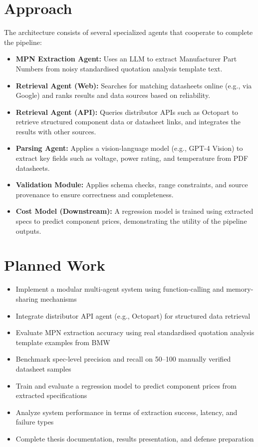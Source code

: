 \documentclass[11pt]{article}
\begin{document}
\section*{Approach}
The architecture consists of several specialized agents that cooperate to complete the pipeline:
\begin{itemize}
  \item \textbf{MPN Extraction Agent:} Uses an LLM to extract Manufacturer Part Numbers from noisy standardised quotation analysis template text.
  \item \textbf{Retrieval Agent (Web):} Searches for matching datasheets online (e.g., via Google) and  ranks results and data sources based on reliability.
  \item \textbf{Retrieval Agent (API):} Queries distributor APIs such as Octopart to retrieve structured component data or datasheet links, and integrates the results with other sources.
  \item \textbf{Parsing Agent:} Applies a vision-language model (e.g., GPT-4 Vision) to extract key fields such as voltage, power rating, and temperature from PDF datasheets.
  \item \textbf{Validation Module:} Applies schema checks, range constraints, and source provenance to ensure correctness and completeness.
  \item \textbf{Cost Model (Downstream):} A regression model is trained using extracted specs to predict component prices, demonstrating the utility of the pipeline outputs.
\end{itemize}


\section*{Planned Work}
\begin{itemize}
  \item Implement a modular multi-agent system using function-calling and memory-sharing mechanisms
  \item Integrate distributor API agent (e.g., Octopart) for structured data retrieval
  \item Evaluate MPN extraction accuracy using real standardised quotation analysis template examples from BMW
  \item Benchmark spec-level precision and recall on 50–100 manually verified datasheet samples
  \item Train and evaluate a regression model to predict component prices from extracted specifications
  \item Analyze system performance in terms of extraction success, latency, and failure types
  \item Complete thesis documentation, results presentation, and defense preparation
\end{itemize}
\end{document}
